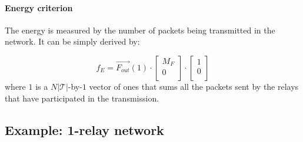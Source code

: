 \documentclass[a4paper]{article}
\newcommand{\T}{\mathcal{T}}
\newcommand{\Fout}[3]{\overrightarrow{ F_{#1}^{#2}}(#3)}
\newcommand{\Nmatrix}{M_F}
\begin{document}
{\hspace{4.2in}{\it q.e.d.}

\paragraph{Energy criterion}

The energy is measured by the number of packets being transmitted in the network. It can be simply derived by:

\[
f_E = \Fout{out}{}{1} \cdot 
	\left[ \begin{array}{c} 
		\Nmatrix  \\ 
		0	 \\ 
	\end{array} \right] 
\cdot \left[ 
	\begin{array}{c} 
		1  \\ 
		0	 \\ 
	\end{array}
\right]
\]
\noindent where $1$ is a $N|\T|$-by-$1$ vector of ones that sums all the packets sent by the relays that have participated in the transmission.

\subsection{Example: 1-relay network}

}
\end{document}
